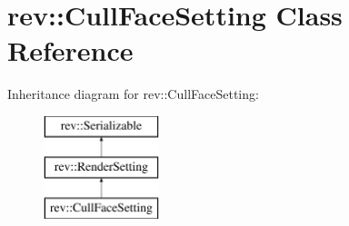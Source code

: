 \hypertarget{classrev_1_1_cull_face_setting}{}\section{rev\+::Cull\+Face\+Setting Class Reference}
\label{classrev_1_1_cull_face_setting}
Inheritance diagram for rev\+::Cull\+Face\+Setting\+:\begin{figure}[H]
\begin{center}
\leavevmode
\includegraphics[height=3.000000cm]{classrev_1_1_cull_face_setting}
\end{center}
\end{figure}
